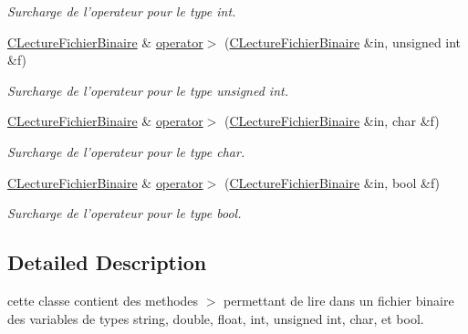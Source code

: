 \begin{DoxyCompactItemize}
\begin{DoxyCompactList}\small\item\em Surcharge de l'operateur pour le type {\itshape int}. \end{DoxyCompactList}\item 
\hypertarget{class_c_lecture_fichier_binaire_a10555985d21e9277fd610554eb804ad4}{\hyperlink{class_c_lecture_fichier_binaire}{C\-Lecture\-Fichier\-Binaire} \& \hyperlink{class_c_lecture_fichier_binaire_a10555985d21e9277fd610554eb804ad4}{operator$>$} (\hyperlink{class_c_lecture_fichier_binaire}{C\-Lecture\-Fichier\-Binaire} \&in, unsigned int \&f)}\label{class_c_lecture_fichier_binaire_a10555985d21e9277fd610554eb804ad4}

\begin{DoxyCompactList}\small\item\em Surcharge de l'operateur pour le type {\itshape unsigned} {\itshape int}. \end{DoxyCompactList}\item 
\hypertarget{class_c_lecture_fichier_binaire_a4a3ac4fa35e1f11664f6612d554d72bd}{\hyperlink{class_c_lecture_fichier_binaire}{C\-Lecture\-Fichier\-Binaire} \& \hyperlink{class_c_lecture_fichier_binaire_a4a3ac4fa35e1f11664f6612d554d72bd}{operator$>$} (\hyperlink{class_c_lecture_fichier_binaire}{C\-Lecture\-Fichier\-Binaire} \&in, char \&f)}\label{class_c_lecture_fichier_binaire_a4a3ac4fa35e1f11664f6612d554d72bd}

\begin{DoxyCompactList}\small\item\em Surcharge de l'operateur pour le type {\itshape char}. \end{DoxyCompactList}\item 
\hypertarget{class_c_lecture_fichier_binaire_aaf7fbfa5e060c1e9015b0ffbd013f3e3}{\hyperlink{class_c_lecture_fichier_binaire}{C\-Lecture\-Fichier\-Binaire} \& \hyperlink{class_c_lecture_fichier_binaire_aaf7fbfa5e060c1e9015b0ffbd013f3e3}{operator$>$} (\hyperlink{class_c_lecture_fichier_binaire}{C\-Lecture\-Fichier\-Binaire} \&in, bool \&f)}\label{class_c_lecture_fichier_binaire_aaf7fbfa5e060c1e9015b0ffbd013f3e3}

\begin{DoxyCompactList}\small\item\em Surcharge de l'operateur pour le type {\itshape bool}. \end{DoxyCompactList}\end{DoxyCompactItemize}


\subsection{Detailed Description}
cette classe contient des methodes $>$ permettant de lire dans un fichier binaire des variables de types string, double, float, int, unsigned int, char, et bool. 

